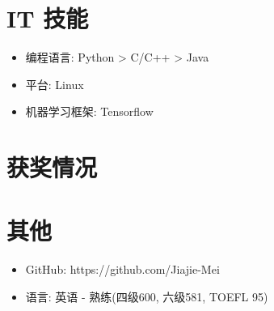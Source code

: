 \documentclass{resume}
\begin{document}
\section{IT 技能}
\begin{itemize}[parsep=0.5ex]
  \item 编程语言: Python > C/C++ > Java
  \item 平台: Linux
  \item 机器学习框架: Tensorflow
\end{itemize}

\section{获奖情况}

\section{其他}
\begin{itemize}[parsep=0.5ex]
  \item GitHub: https://github.com/Jiajie-Mei
  \item 语言: 英语 - 熟练(四级600, 六级581, TOEFL 95)
\end{itemize}

%
%
\end{document}
